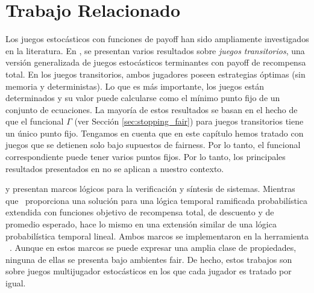 \section{Trabajo Relacionado} \label{sec:related_work_fair}

Los juegos estocásticos con funciones de payoff han sido ampliamente investigados en la literatura. En \cite{FilarV96}, se presentan varios resultados sobre \emph{juegos transitorios},
una versión generalizada de juegos estocásticos terminantes con payoff de recompensa total.
En los juegos transitorios, ambos jugadores poseen estrategias óptimas (sin memoria y deterministas).
Lo que es más importante, los juegos están determinados y su valor puede calcularse como el mínimo punto fijo de un conjunto de ecuaciones.
La mayoría de estos resultados se basan en el hecho de que el funcional $\Gamma$ (ver Sección \ref{sec:stopping_fair}) para juegos transitorios tiene un único punto fijo.
Tengamos en cuenta que en este capítulo hemos tratado con juegos que se detienen solo bajo supuestos de fairness. Por lo tanto, el funcional correspondiente
puede tener varios puntos fijos. Por lo tanto, los principales resultados presentados en \cite{FilarV96} no se aplican a nuestro contexto.

\cite{DBLP:journals/fmsd/ChenFKPS13} y \cite{SvorenovaKwiatkowska16} presentan marcos lógicos para la verificación y síntesis de sistemas. Mientras que~\cite{DBLP:journals/fmsd/ChenFKPS13} proporciona una solución para una lógica temporal ramificada probabilística extendida con funciones objetivo de recompensa total, de descuento y de promedio esperado, \cite{SvorenovaKwiatkowska16} hace lo mismo en una extensión similar de una lógica probabilística temporal lineal. Ambos marcos se implementaron en la herramienta \Prism~\cite{DBLP:conf/cav/KwiatkowskaN0S20,DBLP:conf/cav/KwiatkowskaNP11}. Aunque en estos marcos se puede expresar una amplia clase de propiedades, ninguna de ellas se presenta bajo ambientes fair. De hecho, estos trabajos son sobre juegos multijugador estocásticos en los que cada jugador es tratado por igual.


